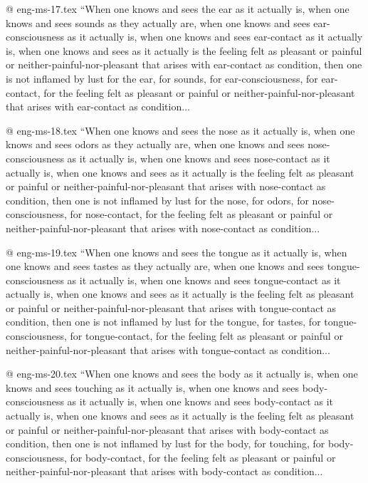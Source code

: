 @ eng-ms-17.tex
	“When one knows and sees the ear as it actually is, when one knows and sees sounds as they actually are, when one knows and sees ear-consciousness as it actually is, when one knows and sees ear-contact as it actually is, when one knows and sees as it actually is the feeling felt as pleasant or painful or neither-painful-nor-pleasant that arises with ear-contact as condition, then one is not inflamed by lust for the ear, for sounds, for ear-consciousness, for ear-contact, for the feeling felt as pleasant or painful or neither-painful-nor-pleasant that arises with ear-contact as condition...

@ eng-ms-18.tex
	“When one knows and sees the nose as it actually is, when one knows and sees odors as they actually are, when one knows and sees nose-consciousness as it actually is, when one knows and sees nose-contact as it actually is, when one knows and sees as it actually is the feeling felt as pleasant or painful or neither-painful-nor-pleasant that arises with nose-contact as condition, then one is not inflamed by lust for the nose, for odors, for nose-consciousness, for nose-contact, for the feeling felt as pleasant or painful or neither-painful-nor-pleasant that arises with nose-contact as condition...

@ eng-ms-19.tex
	“When one knows and sees the tongue as it actually is, when one knows and sees tastes as they actually are, when one knows and sees tongue-consciousness as it actually is, when one knows and sees tongue-contact as it actually is, when one knows and sees as it actually is the feeling felt as pleasant or painful or neither-painful-nor-pleasant that arises with tongue-contact as condition, then one is not inflamed by lust for the tongue, for tastes, for tongue-consciousness, for tongue-contact, for the feeling felt as pleasant or painful or neither-painful-nor-pleasant that arises with tongue-contact as condition...

@ eng-ms-20.tex
	“When one knows and sees the body as it actually is, when one knows and sees touching as it actually is, when one knows and sees body-consciousness as it actually is, when one knows and sees body-contact as it actually is, when one knows and sees as it actually is the feeling felt as pleasant or painful or neither-painful-nor-pleasant that arises with body-contact as condition, then one is not inflamed by lust for the body, for touching, for body-consciousness, for body-contact, for the feeling felt as pleasant or painful or neither-painful-nor-pleasant that arises with body-contact as condition...

